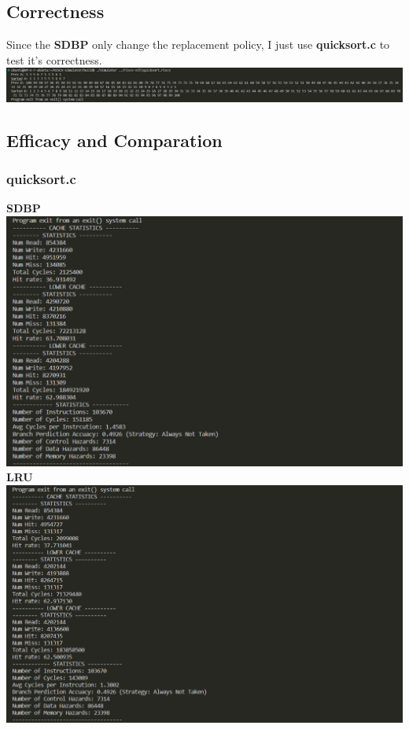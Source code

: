 \documentclass{article}
\begin{document}
\subsection{Correctness}
Since the \textbf{SDBP} only change the replacement policy, I just use \textbf{quicksort.c} to test it's correctness.
\includegraphics[scale = 0.25]{task2 correctness.png}\\

\subsection{Efficacy and Comparation}
\subsubsection{quicksort.c}
\textbf{SDBP}\\
\includegraphics[scale = 0.25]{LDBP quick.png}\\
\textbf{LRU}\\
\includegraphics[scale = 0.25]{LRU quick.png}\\
\end{document}
